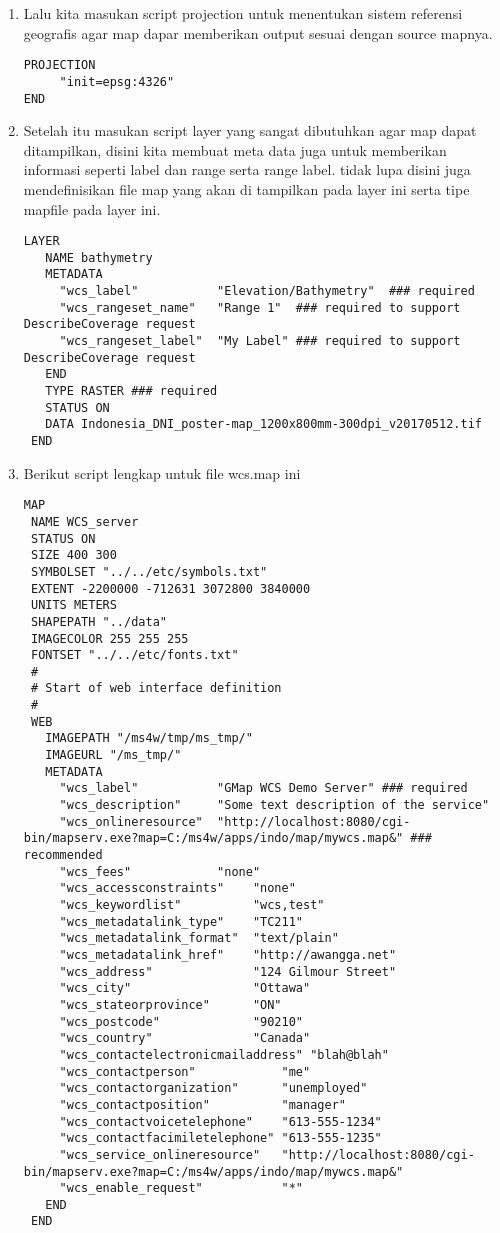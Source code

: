 \begin{enumerate}
\item Lalu kita masukan script projection untuk menentukan sistem referensi geografis agar map dapar memberikan output sesuai dengan source mapnya.
\begin{lstlisting}
PROJECTION
     "init=epsg:4326"
END
\end{lstlisting}

\item Setelah itu masukan script layer yang sangat dibutuhkan agar map dapat ditampilkan, disini kita membuat meta data juga untuk memberikan informasi seperti label dan range serta range label. tidak lupa disini juga mendefinisikan file map yang akan di tampilkan pada layer ini serta tipe mapfile pada layer ini.
\begin{lstlisting}
LAYER
   NAME bathymetry
   METADATA
     "wcs_label"           "Elevation/Bathymetry"  ### required
     "wcs_rangeset_name"   "Range 1"  ### required to support DescribeCoverage request
     "wcs_rangeset_label"  "My Label" ### required to support DescribeCoverage request
   END
   TYPE RASTER ### required
   STATUS ON
   DATA Indonesia_DNI_poster-map_1200x800mm-300dpi_v20170512.tif
 END
\end{lstlisting}

\item Berikut script lengkap untuk file wcs.map ini
\begin{lstlisting}
MAP
 NAME WCS_server
 STATUS ON
 SIZE 400 300
 SYMBOLSET "../../etc/symbols.txt"
 EXTENT -2200000 -712631 3072800 3840000
 UNITS METERS
 SHAPEPATH "../data"
 IMAGECOLOR 255 255 255
 FONTSET "../../etc/fonts.txt"
 #
 # Start of web interface definition
 #
 WEB
   IMAGEPATH "/ms4w/tmp/ms_tmp/"
   IMAGEURL "/ms_tmp/"
   METADATA
     "wcs_label"           "GMap WCS Demo Server" ### required
     "wcs_description"     "Some text description of the service"
     "wcs_onlineresource"  "http://localhost:8080/cgi-bin/mapserv.exe?map=C:/ms4w/apps/indo/map/mywcs.map&" ### recommended
     "wcs_fees"            "none"
     "wcs_accessconstraints"    "none"
     "wcs_keywordlist"          "wcs,test"
     "wcs_metadatalink_type"    "TC211"
     "wcs_metadatalink_format"  "text/plain"
     "wcs_metadatalink_href"    "http://awangga.net"
     "wcs_address"              "124 Gilmour Street"
     "wcs_city"                 "Ottawa"
     "wcs_stateorprovince"      "ON"
     "wcs_postcode"             "90210"
     "wcs_country"              "Canada"
     "wcs_contactelectronicmailaddress" "blah@blah"
     "wcs_contactperson"            "me"
     "wcs_contactorganization"      "unemployed"
     "wcs_contactposition"          "manager"
     "wcs_contactvoicetelephone"    "613-555-1234"
     "wcs_contactfacimiletelephone" "613-555-1235"
     "wcs_service_onlineresource"   "http://localhost:8080/cgi-bin/mapserv.exe?map=C:/ms4w/apps/indo/map/mywcs.map&"
     "wcs_enable_request"           "*"
   END
 END


\end{lstlisting}
\end{enumerate}
